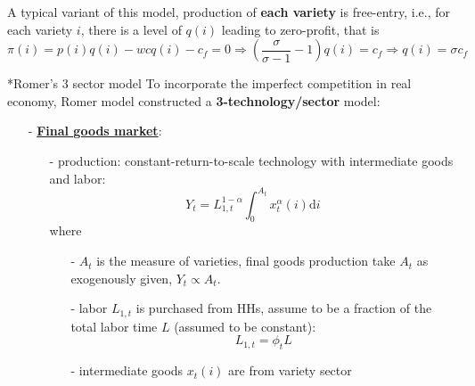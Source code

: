 \documentclass[10pt,landscape,a4paper]{article}
\makeatletter
\renewcommand{\subsection}{\@startsection{subsection}{1}{0mm}{.2ex}{.2ex}{\small\bfseries}}
\makeatother
\begin{document}
\begin{multicols*}{3}
A typical variant of this model, production of \textbf{each variety} is free-entry, i.e., for each variety $i$, there is a level of $q(i)$ leading to zero-profit, that is 
$$
\pi(i)=p(i)q(i)- wcq(i)-c_f=0\Rightarrow \left(\frac{\sigma}{\sigma-1}-1\right) q(i) = c_f\Rightarrow q(i)=\sigma c_f
$$

\subsection*{Romer's 3 sector model}
To incorporate the imperfect competition in real economy, Romer model constructed a \textbf{3-technology/sector} model:

\vspace{2pt}

\begin{itemize}
    \item[-] \underline{\textbf{Final goods market}}:
    \begin{itemize}
        \item[-] production: constant-return-to-scale technology with intermediate goods and labor:
        $$
        Y_t = L_{1,t}^{1-\alpha}\int^{A_t}_0 x_t^{\alpha}(i)\mathrm{d}i
        $$
        where
        \begin{itemize}
            \item[-] $A_t$ is the measure of varieties, final goods production take $A_t$ as exogenously given, $Y_t \propto A_t$.
            \item[-] labor $L_{1,t}$ is purchased from HHs, assume to be a fraction of the total labor time $L$ (assumed to be constant): 
            $$L_{1,t}=\phi_t L$$
            \item[-] intermediate goods $x_t(i)$ are from variety sector
        \end{itemize}
        

\end{itemize}
\end{itemize}
\end{multicols*}
\end{document}
